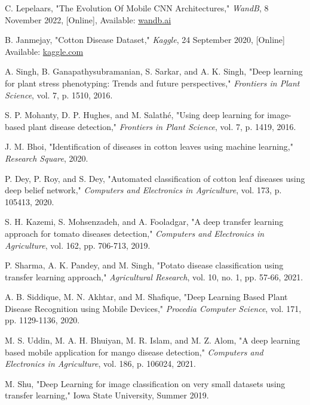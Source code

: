 \documentclass[conference]{IEEEtran}
\begin{document}
\begin{thebibliography}{00}
 C. Lepelaars, "The Evolution Of Mobile CNN Architectures," \textit{WandB}, 8 November 2022, [Online], Available: \href{https://wandb.ai/carlolepelaars/mobile_architectures/reports/The-Evolution-Of-Mobile-CNN-Architectures--VmlldzoyMDQ0ODQ}{wandb.ai}

 B. Janmejay, "Cotton Disease Dataset," \textit{Kaggle}, 24 September 2020, [Online] Available: \href{https://www.kaggle.com/janmejaybhoi/cotton-disease-dataset/notebooks}{kaggle.com}

 A. Singh, B. Ganapathysubramanian, S. Sarkar, and A. K. Singh, "Deep learning for plant stress phenotyping: Trends and future perspectives," \textit{Frontiers in Plant Science}, vol. 7, p. 1510, 2016.

 S. P. Mohanty, D. P. Hughes, and M. Salathé, "Using deep learning for image-based plant disease detection," \textit{Frontiers in Plant Science}, vol. 7, p. 1419, 2016.

 J. M. Bhoi, "Identification of diseases in cotton leaves using machine learning," \textit{Research Square}, 2020.

 P. Dey, P. Roy, and S. Dey, "Automated classification of cotton leaf diseases using deep belief network," \textit{Computers and Electronics in Agriculture}, vol. 173, p. 105413, 2020.

 S. H. Kazemi, S. Mohsenzadeh, and A. Fooladgar, "A deep transfer learning approach for tomato diseases detection," \textit{Computers and Electronics in Agriculture}, vol. 162, pp. 706-713, 2019.

 P. Sharma, A. K. Pandey, and M. Singh, "Potato disease classification using transfer learning approach," \textit{Agricultural Research}, vol. 10, no. 1, pp. 57-66, 2021.

 A. B. Siddique, M. N. Akhtar, and M. Shafique, "Deep Learning Based Plant Disease Recognition using Mobile Devices," \textit{Procedia Computer Science}, vol. 171, pp. 1129-1136, 2020.

 M. S. Uddin, M. A. H. Bhuiyan, M. R. Islam, and M. Z. Alom, "A deep learning based mobile application for mango disease detection," \textit{Computers and Electronics in Agriculture}, vol. 186, p. 106024, 2021.

 M. Shu, "Deep Learning for image classification on very small datasets using transfer learning," Iowa State University, Summer 2019.


\end{thebibliography}
\end{document}
